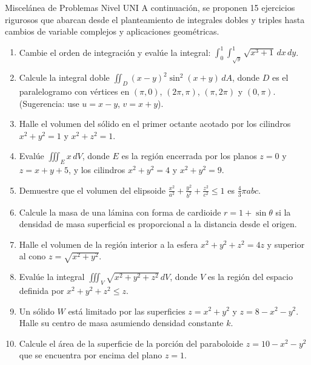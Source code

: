 \documentclass[11pt,a4paper]{article}
\begin{document}
\begin{ejerciciobox}{Miscelánea de Problemas Nivel UNI}
A continuación, se proponen 15 ejercicios rigurosos que abarcan desde el planteamiento de integrales dobles y triples hasta cambios de variable complejos y aplicaciones geométricas.

\begin{enumerate}
    \item Cambie el orden de integración y evalúe la integral: 
    $\int_0^1 \int_{\sqrt{y}}^1 \sqrt{x^3 + 1} \, dx \, dy$.
    
    \item Calcule la integral doble $\iint_D (x-y)^2 \sin^2(x+y) \, dA$, donde $D$ es el paralelogramo con vértices en $(\pi,0)$, $(2\pi,\pi)$, $(\pi,2\pi)$ y $(0,\pi)$. (Sugerencia: use $u=x-y$, $v=x+y$).
    
    \item Halle el volumen del sólido en el primer octante acotado por los cilindros $x^2 + y^2 = 1$ y $x^2 + z^2 = 1$.
    
    \item Evalúe $\iiint_E x \, dV$, donde $E$ es la región encerrada por los planos $z=0$ y $z=x+y+5$, y los cilindros $x^2+y^2=4$ y $x^2+y^2=9$.
    
    \item Demuestre que el volumen del elipsoide $\frac{x^2}{a^2} + \frac{y^2}{b^2} + \frac{z^2}{c^2} \leq 1$ es $\frac{4}{3}\pi abc$.
    
    \item Calcule la masa de una lámina con forma de cardioide $r = 1 + \sin \theta$ si la densidad de masa superficial es proporcional a la distancia desde el origen.
    
    \item Halle el volumen de la región interior a la esfera $x^2 + y^2 + z^2 = 4z$ y superior al cono $z = \sqrt{x^2 + y^2}$.
    
    \item Evalúe la integral $\iiint_V \sqrt{x^2+y^2+z^2} \, dV$, donde $V$ es la región del espacio definida por $x^2 + y^2 + z^2 \leq z$.
    
    \item Un sólido $W$ está limitado por las superficies $z = x^2+y^2$ y $z = 8 - x^2 - y^2$. Halle su centro de masa asumiendo densidad constante $k$.
    
    \item Calcule el área de la superficie de la porción del paraboloide $z = 10 - x^2 - y^2$ que se encuentra por encima del plano $z = 1$.
    

\end{enumerate}
\end{ejerciciobox}
\end{document}
